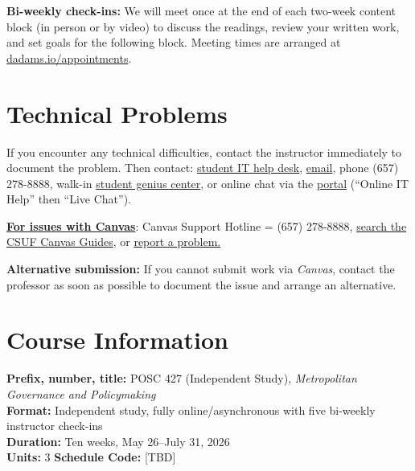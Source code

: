 \documentclass[12pt]{article}
\begin{document}
\vspace{0.5em}
\noindent \textbf{Bi-weekly check-ins:} We will meet once at the end of each two-week content block (in person or by video) to discuss the readings, review your written work, and set goals for the following block. Meeting times are arranged at \href{https://dadams.io/appointments}{dadams.io/appointments}.

\section*{Technical Problems}

If you encounter any technical difficulties, contact the instructor immediately to document the problem. Then contact: \href{http://www.fullerton.edu/it/students/helpdesk/index.php}{student IT help desk}, \href{mailto:StudentITHelpDesk@fullerton.edu}{email}, phone (657) 278-8888, walk-in \href{http://www.fullerton.edu/it/students/sgc/index.php}{student genius center}, or online chat via the \href{http://my.fullerton.edu}{portal} (``Online IT Help'' then ``Live Chat'').

\vspace{0.5em}
\noindent \textbf{\underline{For issues with Canvas}}: Canvas Support Hotline = (657) 278-8888, \href{https://canvashelp.fullerton.edu/}{search the CSUF Canvas Guides}, or \href{https://titans.service-now.com/sp?id=sc_cat_item&sys_id=f88efe80ebea6a10fb7cfcffcad0cdc6&subject=Canvas}{report a problem.}

\vspace{0.5em}
\noindent \textbf{Alternative submission:} If you cannot submit work via \emph{Canvas}, contact the professor as soon as possible to document the issue and arrange an alternative.

\section*{Course Information}
\noindent \textbf{Prefix, number, title:} POSC 427 (Independent Study), \textit{Metropolitan Governance and Policymaking} \\
\noindent \textbf{Format:} Independent study, fully online/asynchronous with five bi-weekly instructor check-ins \\
\noindent \textbf{Duration:} Ten weeks, May 26--July 31, 2026 \\
\noindent \textbf{Units:} 3 \quad \textbf{Schedule Code:} [TBD]
\end{document}
